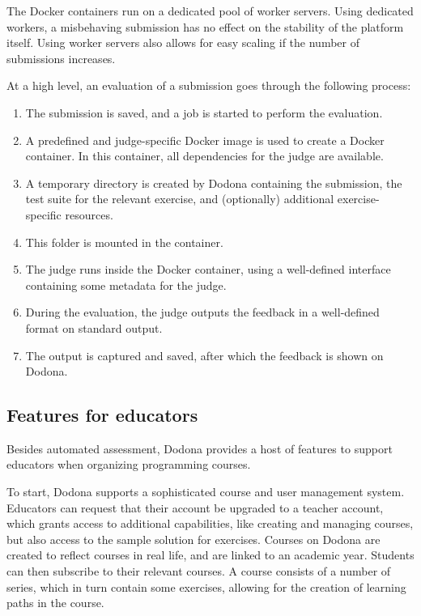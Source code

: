 \documentclass[../main]{subfiles}
\begin{document}
The Docker containers run on a dedicated pool of worker servers.
Using dedicated workers, a misbehaving submission has no effect on the stability of the platform itself.
Using worker servers also allows for easy scaling if the number of submissions increases.

At a high level, an evaluation of a submission goes through the following process:
\begin{enumerate}[noitemsep,beginpenalty=10000]
    \item The submission is saved, and a job is started to perform the evaluation.
    \item A predefined and judge-specific Docker image is used to create a Docker container.
          In this container, all dependencies for the judge are available.
    \item A temporary directory is created by Dodona containing the submission, the test suite for the relevant exercise, and (optionally) additional exercise-specific resources.
    \item This folder is mounted in the container.
    \item The judge runs inside the Docker container, using a well-defined interface containing some metadata for the judge.
    \item During the evaluation, the judge outputs the feedback in a well-defined format on standard output.
    \item The output is captured and saved, after which the feedback is shown on Dodona.
\end{enumerate}

\subsection{Features for educators}\label{subsec:features-for-educators}

Besides automated assessment, Dodona provides a host of features to support educators when organizing programming courses.

To start, Dodona supports a sophisticated course and user management system.
Educators can request that their account be upgraded to a teacher account, which grants access to additional capabilities, like creating and managing courses, but also access to the sample solution for exercises.
Courses on Dodona are created to reflect courses in real life, and are linked to an academic year.
Students can then subscribe to their relevant courses.
A course consists of a number of series, which in turn contain some exercises, allowing for the creation of learning paths in the course.
\end{document}
